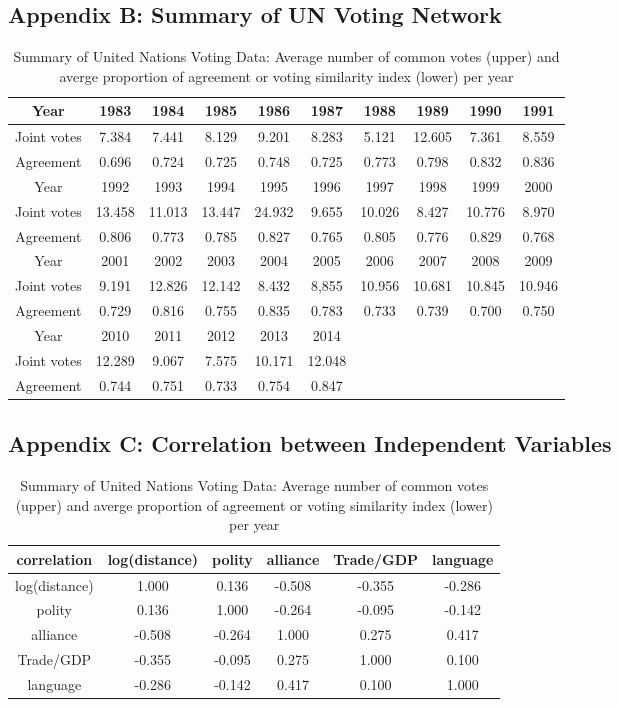 \documentclass[a4paper]{article}
\begin{document}
\subsection*{Appendix B: Summary of UN Voting Network}
\begin{table}[ht]
	\centering
	\begin{tabular}{ |c|c|c|c|c|c|c|c|c|c|} 
		\hline
		{Year}	& 1983 & 1984& 1985& 1986 & 1987& 1988& 1989&1990&1991\\ \hline
		Joint votes & 7.384&7.441&8.129&9.201&8.283&5.121&12.605&7.361&8.559\\\hline
		Agreement & 0.696& 0.724& 0.725 & 0.748& 0.725& 0.773 & 0.798& 0.832& 0.836\\\hline\hline 
		{Year}	& 1992&1993& 1994 & 1995& 1996& 1997 & 1998& 1999& 2000\\ \hline
		Joint votes  &13.458&11.013&13.447&24.932&9.655&10.026&8.427&10.776&8.970\\\hline
		Agreement & 0.806&0.773& 0.785& 0.827& 0.765& 0.805& 0.776& 0.829 & 0.768\\\hline\hline
		{Year}	&2001&2002&2003&2004&2005& 2006& 2007& 2008&  2009\\ \hline
		Joint votes &9.191&12.826&12.142&8.432&8,855&10.956&10.681&10.845&10.946\\\hline
		Agreement &0.729& 0.816& 0.755& 0.835& 0.783& 0.733& 0.739&0.700&0.750\\
		\hline\hline
		Year & 2010& 2011&2012&2013&2014&&&&\\\hline
		Joint votes&12.289&9.067&7.575&10.171&12.048&&&&\\\hline
		Agreement&  0.744& 0.751& 0.733&0.754&0.847&&&&\\\hline
	\end{tabular}
	\caption {Summary of United Nations Voting Data: Average number of common votes (upper) and averge proportion of agreement or voting similarity index (lower) per year}
	\label{table:EDA}
\end{table}
\subsection*{Appendix C: Correlation between Independent Variables}
\begin{table}[ht]
	\centering
	\begin{tabular}{ |c|ccccc|} 
		\hline
	correlation & 	log(distance) & polity &   alliance &  Trade/GDP  &  language\\
	 \hline
			log(distance)& 1.000& 0.136&  -0.508&-0.355&-0.286\\
			polity&0.136&1.000& -0.264&-0.095&-0.142\\
			alliance& -0.508&-0.264&1.000&0.275& 0.417\\
			Trade/GDP&  -0.355& -0.095& 0.275& 1.000& 0.100\\
			language& -0.286&-0.142& 0.417& 0.100& 1.000\\
					\hline
	\end{tabular}
	\caption {Summary of United Nations Voting Data: Average number of common votes (upper) and averge proportion of agreement or voting similarity index (lower) per year}
	\label{table:correlation}
\end{table}
\end{document}
